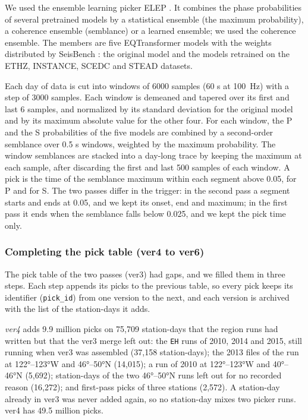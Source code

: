 \documentclass[review]{seismica}
\begin{document}
We used the ensemble learning picker ELEP \citep{Yuan23}. It combines
the phase probabilities of several pretrained models by a statistical
ensemble (the maximum probability), a coherence ensemble (semblance) or
a learned ensemble; we used the coherence ensemble. The members are five
EQTransformer models \citep{mousavi2020earthquake} with the weights
distributed by SeisBench \citep{woollam2022seisbench}: the original
model and the models retrained on the ETHZ, INSTANCE, SCEDC and STEAD
datasets.

Each day of data is cut into windows of 6000 samples (60 s at 100~Hz)
with a step of 3000 samples. Each window is demeaned and tapered over
its first and last 6 samples, and normalized by its standard deviation
for the original model and by its maximum absolute value for the other
four. For each window, the P and the S probabilities of the five models
are combined by a second-order semblance over 0.5 s windows, weighted by
the maximum probability. The window semblances are stacked into a
day-long trace by keeping the maximum at each sample, after discarding
the first and last 500 samples of each window. A pick is the time of the
semblance maximum within each segment above 0.05, for P and for S. The
two passes differ in the trigger: in the second pass a segment starts
and ends at 0.05, and we kept its onset, end and maximum; in the first
pass it ends when the semblance falls below 0.025, and we kept the pick
time only.

\subsubsection{Completing the pick table (ver4 to
ver6)}\label{sec:pickfill}

The pick table of the two passes (ver3) had gaps, and we filled them in
three steps. Each step appends its picks to the previous table, so every
pick keeps its identifier (\texttt{pick\_id}) from one version to the
next, and each version is archived with the list of the station-days it
adds.

\emph{ver4} adds 9.9 million picks on 75,709 station-days that the
region runs had written but that the ver3 merge left out: the
\texttt{EH} runs of 2010, 2014 and 2015, still running when ver3 was
assembled (37,158 station-days); the 2013 files of the run at
122°--123°W and 46°--50°N (14,015); a run of 2010 at 122°--123°W and
40°--46°N (5,692); station-days of the two 46°--50°N runs left out for
no recorded reason (16,272); and first-pass picks of three stations
(2,572). A station-day already in ver3 was never added again, so no
station-day mixes two picker runs. ver4 has 49.5 million picks.
\end{document}
